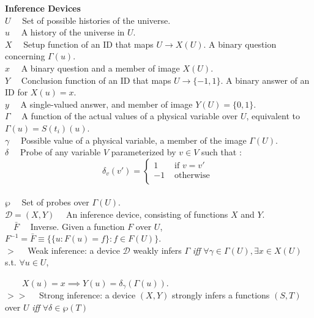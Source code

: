 \documentclass[11pt]{article}
\begin{document}
\textbf{Inference Devices} \\
$ U \quad $ Set of possible histories of the universe. \\
$ u \quad $ A history of the universe in $ U $. \\ 
$ X \quad $ Setup function of an ID that maps $ U \rightarrow X(U) $. A binary question concerning $ \Gamma(u) $. \\
$ x \quad $ A binary question and a member of image $ X(U) $. \\ 
$ Y \quad $ Conclusion function of an ID that maps $ U \rightarrow \{-1, 1\} $. A binary answer of an ID for  $ X(u) = x $. \\ 
$ y \quad $ A single-valued answer, and member of image $ Y(U)  = \{0, 1\} $. \\ 
$ \Gamma \quad $ A function of the actual values of a physical variable over $U$, equivalent to $\Gamma(u) = S(t_i)(u)$.  \\
$ \gamma \quad $ Possible value of a physical variable, a member of the image $\Gamma(U)$. \\
$ \delta \quad $ Probe of any variable $V$ parameterized by $v \in V$ such that : 
	  \[ \delta_v (v') =
	  \begin{cases} 
       1 & \text{ if } v = v' \\
       -1 & \text{ otherwise } \\
      \end{cases}\] \\
$ \wp \quad $ Set of probes over $\Gamma(U)$. \\
$ \mathcal{D} = (X, Y) \quad $ An inference device, consisting of functions $ X $ and $ Y $. \\
$ \quad \bar{F} \quad $ Inverse. Given a function $ F $ over $ U $, $F ^ {-1} = \bar{F} \equiv \{\{u : F(u) = f \} : f \in F(U) \} $. \\
$ > \quad $ Weak inference: a device $\mathcal{D}$ weakly infers $\Gamma$ \textit{iff} $ \forall \gamma \in \Gamma(U), \exists x \in X(U) $ s.t. $ \forall u \in U $, 

$ \quad \quad X(u) = x \implies Y(u) = \delta_{\gamma}(\Gamma(u)) $.  \\
$ >> \quad $ Strong inference: a device $ (X, Y) $ strongly infers a functions $ (S, T) $ over $ U $ \textit{ iff } $\forall \delta \in \wp(T) $ 
\end{document}
